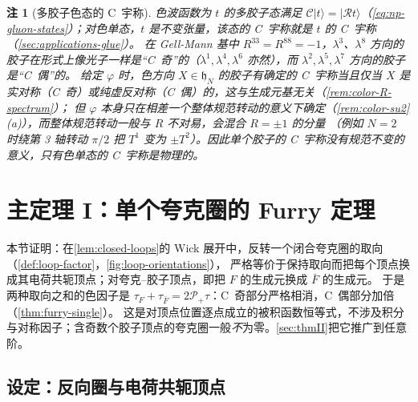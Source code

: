 \documentclass[UTF8,a4paper,11pt,fontset=fandol]{ctexart}
\theoremstyle{cplain}
\theoremstyle{cdefinition}
\theoremstyle{cremark}
\newtheorem{remark}[theorem]{注}
\numberwithin{equation}{section}
\newcommand{\Cop}{\mathcal{C}}                       %
\newcommand{\Rop}{\mathcal{R}}                       %
\newcommand{\Pp}{\mathcal{P}_{+}}                    %
\begin{document}
\begin{remark}[多胶子色态的 C~宇称]\label{rem:color-states}
色波函数为 $t$ 的多胶子态满足 $\Cop|t\rangle=|\Rop t\rangle$（\cref{eq:np-gluon-states}）；对色单态，$t$ 是不变张量，该态的 C~宇称就是 $t$ 的 C~宇称（\cref{sec:applications-glue}）。
在 Gell-Mann 基中 $R^{33}=R^{88}=-1$，$\lambda^3$、$\lambda^8$ 方向的胶子在形式上像光子一样是“C~奇”的（$\lambda^1,\lambda^4,\lambda^6$ 亦然），而 $\lambda^2,\lambda^5,\lambda^7$ 方向的胶子是“C~偶”的。
给定 $\varphi$ 时，色方向 $X\in\mathfrak h_N$ 的胶子有确定的 C~宇称当且仅当 $X$ 是实对称（C~奇）或纯虚反对称（C~偶）的，这与生成元基无关（\cref{rem:color-R-spectrum}）；
但 $\varphi$ 本身只在相差一个整体规范转动的意义下确定（\cref{rem:color-su2}(a)），而整体规范转动一般与 $R$ 不对易，会混合 $R=\pm1$ 的分量
（例如 $N=2$ 时绕第 3 轴转动 $\pi/2$ 把 $T^1$ 变为 $\pm T^2$）。因此单个胶子的 C~宇称没有规范不变的意义，只有色单态的 C~宇称是物理的。
\end{remark}

\section{主定理 I：单个夸克圈的 Furry 定理}\label{sec:thmI}

本节证明：在\cref{lem:closed-loops}的 Wick 展开中，反转一个闭合夸克圈的取向（\cref{def:loop-factor}，\cref{fig:loop-orientations}），
严格等价于保持取向而把每个顶点换成其电荷共轭顶点；对夸克--胶子顶点，即把 $F$ 的生成元换成 $\bar F$ 的生成元。
于是两种取向之和的色因子是 $\tau_F+\tau_{\bar F}=2\Pp\tau$：C~奇部分严格相消，C~偶部分加倍（\cref{thm:furry-single}）。
这是对顶点位置逐点成立的被积函数恒等式，不涉及积分与对称因子；含奇数个胶子顶点的夸克圈一般\emph{不}为零。\cref{sec:thmII}把它推广到任意阶。

\subsection{设定：反向圈与电荷共轭顶点}\label{sec:thmI-setup}
\end{document}
